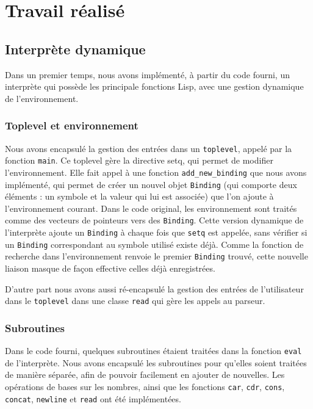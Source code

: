 \documentclass[a4paper,11pt]{article}
\begin{document}
\section{Travail réalisé}

\subsection{Interprète dynamique}

Dans un premier temps, nous avons implémenté, à partir du code fourni, un interprète 
qui possède les principale fonctions Lisp, avec une gestion dynamique de l'environnement.

\subsubsection{Toplevel et environnement}

  Nous avons encapsulé la gestion des entrées dans un \texttt{toplevel}, 
 appelé par la fonction \texttt{main}. Ce toplevel gère la directive setq, qui
 permet de modifier l'environnement. 
 Elle fait appel à une fonction \texttt{add\_new\_binding} que nous avons
 implémenté, qui permet de créer un nouvel objet
  \texttt{Binding} (qui comporte deux éléments : un
 symbole et la valeur qui lui est associée) que l'on ajoute à l'environnement courant. 
 Dans le code original, les environnement sont traités comme des vecteurs de pointeurs 
 vers des
 \texttt{Binding}.  Cette version dynamique de l'interprète ajoute un \texttt{Binding} 
 à chaque fois que \texttt{setq} est appelée, sans vérifier si un \texttt{Binding} 
 correspondant au symbole utilisé existe déjà. Comme la fonction de recherche dans 
 l'environnement renvoie le premier \texttt{Binding} trouvé, cette nouvelle liaison
 masque de façon effective celles déjà enregistrées.
 
 D'autre part nous avons aussi ré-encapsulé la gestion des entrées de l'utilisateur 
 dans le \texttt{toplevel} dans une classe \texttt{read} qui gère les appels au parseur.
 
 \subsubsection{Subroutines}
 
  Dans le code fourni, quelques subroutines étaient traitées dans la fonction 
  \texttt{eval} de l'interprète. Nous avons encapsulé les subroutines pour qu'elles soient 
  traitées de manière séparée, afin de pouvoir facilement en ajouter de nouvelles. 
  Les opérations de bases sur les nombres, ainsi que les fonctions \texttt{car}, 
  \texttt{cdr}, \texttt{cons}, \texttt{concat}, \texttt{newline} et \texttt{read} 
  ont été implémentées.
  
\end{document}
